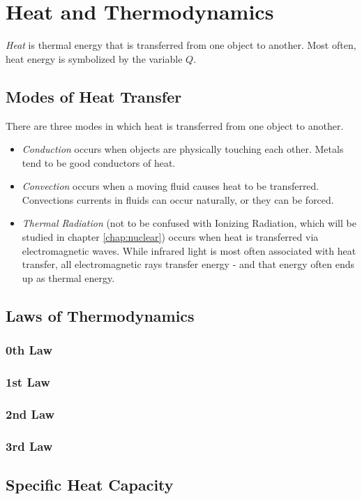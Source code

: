 \chapter{Heat and Thermodynamics}
	\textit{Heat} is thermal energy that is transferred from one object to another.  Most often, heat energy is symbolized by the variable $Q$.  
	\section{Modes of Heat Transfer}
	There are three modes in which heat is transferred from one object to another.   \begin{itemize}
		\item \textit{Conduction} occurs when objects are physically touching each other.  Metals tend to be good conductors of heat. 
		\item   \textit{Convection} occurs when a moving fluid causes heat to be transferred.  Convections currents in fluids can occur naturally, or they can be forced. 
		\item  \textit{Thermal Radiation} (not to be confused with Ionizing Radiation, which will be studied in chapter \ref{chap:nuclear}) occurs when heat is transferred via electromagnetic waves.  While infrared light is most often associated with heat transfer, all electromagnetic rays transfer energy - and that energy often ends up as thermal energy.  
		\end{itemize}
	
	\section{Laws of Thermodynamics}
	\subsection{0th Law}
	
	
	\subsection{1st Law}
	\subsection{2nd Law}
	\subsection{3rd Law}
	
	\section{Specific Heat Capacity}
	


